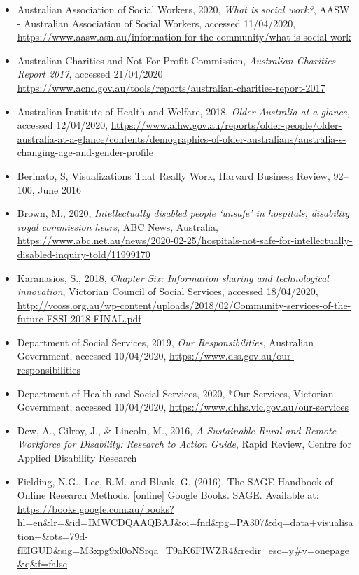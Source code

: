 \documentclass[11pt,]{article}
\begin{document}
\begin{itemize}
\item
  Australian Association of Social Workers, 2020, \emph{What is social
  work?}, AASW - Australian Association of Social Workers, accessed
  11/04/2020,
  \url{https://www.aasw.asn.au/information-for-the-community/what-is-social-work}
\item
  Australian Charities and Not-For-Profit Commission, \emph{Australian
  Charities Report 2017}, accessed 21/04/2020
  \url{https://www.acnc.gov.au/tools/reports/australian-charities-report-2017}
\item
  Australian Institute of Health and Welfare, 2018, \emph{Older
  Australia at a glance}, accessed 12/04/2020,
  \url{https://www.aihw.gov.au/reports/older-people/older-australia-at-a-glance/contents/demographics-of-older-australians/australia-s-changing-age-and-gender-profile}
\item
  Berinato, S, Visualizations That Really Work, Harvard Business Review,
  92--100, June 2016
\item
  Brown, M., 2020, \emph{Intellectually disabled people `unsafe' in
  hospitals, disability royal commission hears}, ABC News, Australia,
  \url{https://www.abc.net.au/news/2020-02-25/hospitals-not-safe-for-intellectually-disabled-inquiry-told/11999170}
\item
  Karanasios, S., 2018, \emph{Chapter Six: Information sharing and
  technological innovation}, Victorian Council of Social Services,
  accessed 18/04/2020,
  \url{http://vcoss.org.au/wp-content/uploads/2018/02/Community-services-of-the-future-FSSI-2018-FINAL.pdf}
\item
  Department of Social Services, 2019, \emph{Our Responsibilities},
  Australian Government, accessed 10/04/2020,
  \url{https://www.dss.gov.au/our-responsibilities}
\item
  Department of Health and Social Services, 2020, *Our Services,
  Victorian Government, accessed 10/04/2020,
  \url{https://www.dhhs.vic.gov.au/our-services}
\item
  Dew, A., Gilroy, J., \& Lincoln, M., 2016, \emph{A Sustainable Rural
  and Remote Workforce for Disability: Research to Action Guide}, Rapid
  Review, Centre for Applied Disability Research
\item
  Fielding, N.G., Lee, R.M. and Blank, G. (2016). The SAGE Handbook of
  Online Research Methods. {[}online{]} Google Books. SAGE. Available
  at:
  \url{https://books.google.com.au/books?hl=en\&lr=\&id=IMWCDQAAQBAJ\&oi=fnd\&pg=PA307\&dq=data+visualisation+\&ots=79d-fEIGUD\&sig=M3xpg9xl0oNSrqa_T9aK6FIWZR4\&redir_esc=y\#v=onepage\&q\&f=false}

\end{itemize}
\end{document}
